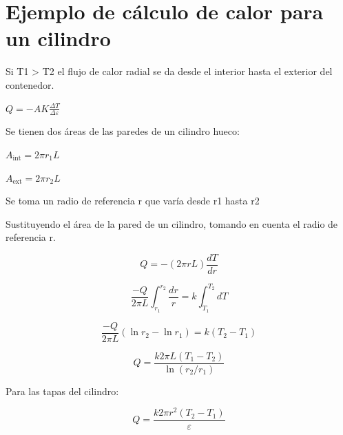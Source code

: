 \section{Ejemplo de cálculo de calor para un cilindro}\label{Ap:Temp_cilindro}

Si T1 > T2 el flujo de calor radial se da desde el interior hasta el exterior del contenedor.
\begin{center}
    
    $Q = -AK\frac{\Delta T}{\Delta \varepsilon} $
\end{center}

Se tienen dos áreas de las paredes de un cilindro hueco:
\begin{center}
    
$A_{\text{int}} = 2\pi r_1 L$ 
\end{center}
\begin{center}
    
$A_{\text{ext}} = 2\pi r_2 L$
\end{center}
Se toma un radio de referencia r que varía desde r1 hasta r2 

Sustituyendo el área de la pared de un cilindro, tomando en cuenta el radio de referencia r.


\[
Q = -(2\pi rL) \frac{dT}{dr}
\]

\[
\frac{-Q}{2\pi L} \int_{r_1}^{r_2} \frac{dr}{r} = k \int_{T_1}^{T_2} dT
\]

\[
\frac{-Q}{2\pi L} (\ln r_2 - \ln r_1) = k(T_2 - T_1)
\]

\[
Q = \frac{k2\pi L(T_1 - T_2)}{\ln(r_2/r_1)}
\]

Para las tapas del cilindro:

\[
Q = \frac{k2\pi r^2 (T_2 - T_1)}{\varepsilon}
\]